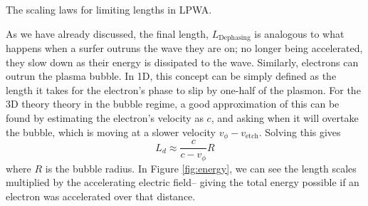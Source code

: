 \documentclass[12pt,letter]{article}
\begin{document}
\begin{margintable}[0pt]
\caption{The scaling laws for limiting lengths in LPWA.}
\end{margintable}
    
    As we have already discussed, the final length, $L_\mathrm{Dephasing}$ is analogous to what happens
    when a surfer outruns the wave they are on; no longer being accelerated,
    they slow down as their energy is dissipated to the wave. Similarly, electrons
    can outrun the plasma bubble. In 1D, this concept can be simply defined
    as the length it takes for the electron's phase to slip by one-half
    of the plasmon. For the 3D theory theory in the bubble regime, a good approximation of this
can be found by estimating the electron's velocity as $c$, and asking
when it will overtake the bubble, which is moving at a slower velocity
$v_\phi-v_\textrm{etch}$. Solving this gives
\begin{equation}
    L_d \approx \frac{c}{c-v_\phi}R
\end{equation}
where $R$ is the bubble radius.
        In Figure \ref{fig:energy}, we can see the length scales multiplied by the
    accelerating electric field-- giving the total energy possible if an
    electron was accelerated over that distance.
    
\end{document}
